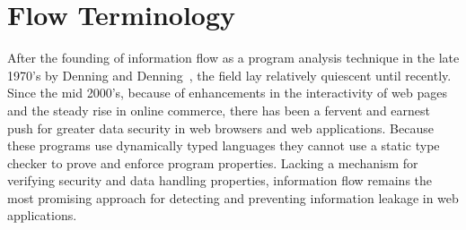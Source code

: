 \chapter{Flow Terminology}
\label{ch:terminology}

\begin{comment}
\begin{table*}
\centering
\begin{tabular}{ccccm{2.5cm}}
\toprule
Category & Descriptor & Example & Flow & Required Analysis \\
\midrule[\heavyrulewidth]
\multirow{3}{*}{Explicit} & Direct &
\begin{js-embed}
b = a
\end{js-embed} & a $\rightarrow$ b & Dataflow\\
\cmidrule(r){2-5} & Indirect &
\begin{js-embed}
b = foo(_, a, _)
c = bar(_, b, _)
\end{js-embed}
& a $\rightarrow$ c & Dataflow (transitive) \\
\hline
\multirow{7}{*}{Implicit} & Active &
\begin{js-embed}
a = true
b = 0
if (a)
   b = 1
else
   ...
\end{js-embed}
& a $\rightarrow$ b & Control Flow (dynamic)\\
\cmidrule(r){2-5} & Passive &
\begin{js-embed}
a = true
c = 0
if (a)
   ...
else
   c = 1
\end{js-embed}
& a $\rightarrow$ c & Control Flow (static)\\
\bottomrule
\end{tabular}
\caption{Terminology of Information Flows.}
\label{table:terminology}
\end{table*}
\end{comment}

After the founding of information flow as a program analysis technique in the late 1970's by Denning and Denning~\cite{denning.denning+77}, the field lay relatively quiescent until recently.
Since the mid 2000's, because of enhancements in the interactivity of web pages and the steady rise in online commerce, there has been a fervent and earnest push for greater data security in web browsers and web applications.
Because these programs use dynamically typed languages they cannot use a static type checker to prove and enforce program properties.
Lacking a mechanism for verifying security and data handling properties, information flow remains the most promising approach for detecting and preventing information leakage in web applications.

